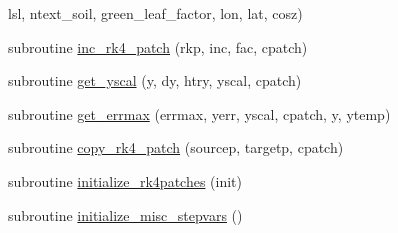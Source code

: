 \begin{DoxyCompactItemize}
                                                                                                                                                                                                                                                             lsl,                                                                                                                                                                                                                                                                                               ntext\+\_\+soil,                                                                                                                                                                                                                                                                   green\+\_\+leaf\+\_\+factor,                                                                                                                                                                                                                                       lon,                                                                                                                                                                                                                                                                                               lat,                                                                                                                                                                                                                                                                                               cosz)
\item 
subroutine \hyperlink{rk4__integ__utils_8f90_af49193356b9147a2e2d22d1b6d703c85}{inc\+\_\+rk4\+\_\+patch} (rkp, inc, fac, cpatch)
\item 
subroutine \hyperlink{rk4__integ__utils_8f90_ac303a9b36d3196827d386ce0b0ff1b4a}{get\+\_\+yscal} (y, dy, htry, yscal, cpatch)
\item 
subroutine \hyperlink{rk4__integ__utils_8f90_a5a12c772a61d8c7c33721ad3594a1c78}{get\+\_\+errmax} (errmax, yerr, yscal, cpatch, y, ytemp)
\item 
subroutine \hyperlink{rk4__integ__utils_8f90_a751ae689c5a58b1faaac99860002ce07}{copy\+\_\+rk4\+\_\+patch} (sourcep, targetp, cpatch)
\item 
subroutine \hyperlink{rk4__integ__utils_8f90_ad341b521196c6605f15db4708a5dde8c}{initialize\+\_\+rk4patches} (init)
\item 
subroutine \hyperlink{rk4__integ__utils_8f90_a1c0f0b66769716ba8fb7d83a66744bf5}{initialize\+\_\+misc\+\_\+stepvars} ()
\end{DoxyCompactItemize}



